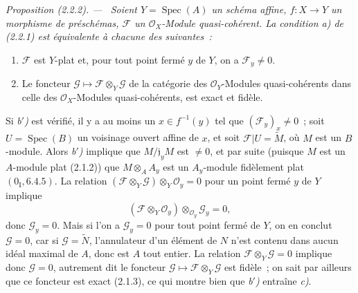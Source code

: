 \documentclass[10pt,oneside]{book}
\newcommand{\oldpage}[2][]{%
  \setcounter{footnote}{0}%
  \marginpar{\scriptsize\textbf{#1}~|~#2}\ignorespaces}
\newenvironment{proposition}[1][]{%
  \par\medskip\noindent\itshape Proposition (#1). ---\ }{\par}
\begin{document}
\begin{proposition}[2.2.2]
\label{IV.2.2.2-fr}
Soient $Y=\operatorname{Spec}(A)$ un schéma affine, $f:X\to Y$ un morphisme
de préschémas, $\mathscr F$ un $\mathcal O_X$-Module quasi-cohérent. La
condition \emph{a)} de (2.2.1) est équivalente à chacune des suivantes~:
\begin{enumerate}
\item[\emph{b$'$)}] $\mathscr F$ est $Y$-plat et, pour tout point fermé $y$
de $Y$, on a $\mathscr F_y\neq0$.
\oldpage[IV-2]{10}
\item[\emph{c)}] Le foncteur
$\mathscr G\mapsto\mathscr F\otimes_Y\mathscr G$ de la catégorie des
$\mathcal O_Y$-Modules quasi-cohérents dans celle des
$\mathcal O_X$-Modules quasi-cohérents, est exact et fidèle.
\end{enumerate}
\end{proposition}

Si \emph{b$'$)} est vérifié, il y a au moins un $x\in f^{-1}(y)$ tel que
$(\mathscr F_y)_x\neq0$~; soit $U=\operatorname{Spec}(B)$ un voisinage ouvert
affine de $x$, et soit $\mathscr F|U=\widetilde M$, où $M$ est un $B$-module.
Alors \emph{b$'$)} implique que $M/\mathfrak j_yM$ est $\neq0$, et par suite
(puisque $M$ est un $A$-module plat (2.1.2)) que
$M\otimes_A A_y$ est un $A_y$-module fidèlement plat
$(0_{\mathrm I},6.4.5)$. La relation
$(\mathscr F\otimes_Y\mathscr G)\otimes_Y\mathcal O_y=0$ pour un point fermé
$y$ de $Y$ implique
\[
(\mathscr F\otimes_Y\mathcal O_y)\otimes_{\mathcal O_y}\mathscr G_y=0,
\]
donc $\mathscr G_y=0$. Mais si l'on a $\mathscr G_y=0$ pour tout point fermé
de $Y$, on en conclut $\mathscr G=0$, car si $\mathscr G=\widetilde N$,
l'annulateur d'un élément de $N$ n'est contenu dans aucun idéal maximal de
$A$, donc est $A$ tout entier. La relation
$\mathscr F\otimes_Y\mathscr G=0$ implique donc $\mathscr G=0$, autrement dit
le foncteur $\mathscr G\mapsto\mathscr F\otimes_Y\mathscr G$ est fidèle~; on
sait par ailleurs que ce foncteur est exact (2.1.3), ce qui montre bien que
\emph{b$'$)} entraîne \emph{c)}.
\end{document}
